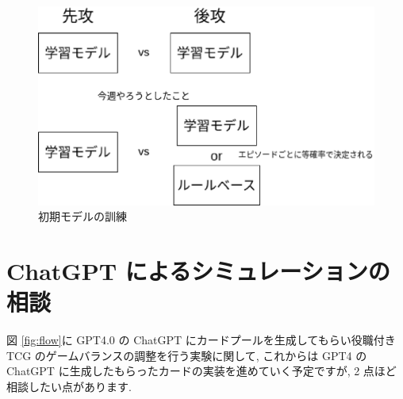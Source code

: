 \documentclass{jarticle}     %
\begin{document}
\begin{figure}[ht]
  \includegraphics[width=120mm]{assets/Initail.eps}
  \vspace{-0.3cm}
  \caption{初期モデルの訓練}
  \label{fig:initail}
\end{figure}

\section{ChatGPT によるシミュレーションの相談}

図 \ref{fig:flow}に GPT4.0 の ChatGPT にカードプールを生成してもらい役職付き TCG のゲームバランスの調整を行う実験に関して, これからは GPT4 の ChatGPT に生成したもらったカードの実装を進めていく予定ですが, 2 点ほど相談したい点があります.
\end{document}
